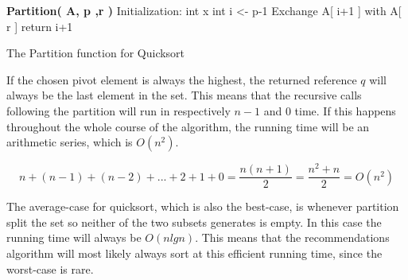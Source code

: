 \begin{algorithm}
	\DontPrintSemicolon
	\textbf{Partition( A, p ,r )}\;
	Initialization:\;
	int x\;
	int i <- p-1\;
	Exchange A[ i+1 ] with A[ r ]\;
	return i+1\;
	\label{Partition}
	\caption{The Partition function for Quicksort}
\end{algorithm}

If the chosen pivot element is always the highest, the returned reference $q$ will always be the last element in the set. This means that the recursive calls following the partition will run in respectively $n-1$ and $0$ time. If this happens throughout the whole course of the algorithm, the running time will be an arithmetic series\cite{AlgoAnal2},  which is $O(n^2)$.

\[
n + (n-1) + (n-2) + ... + 2 + 1 + 0 = \frac{n(n + 1)}{2}  = \frac{n^2 + n}{2} = O(n^2)
\]

The average-case for quicksort, which is also the best-case, is whenever partition split the set so neither of the two subsets generates is empty. In this case the running time will always be $O(nlgn)$. This means that the recommendations algorithm will most likely always sort at this efficient running time, since the worst-case is rare.